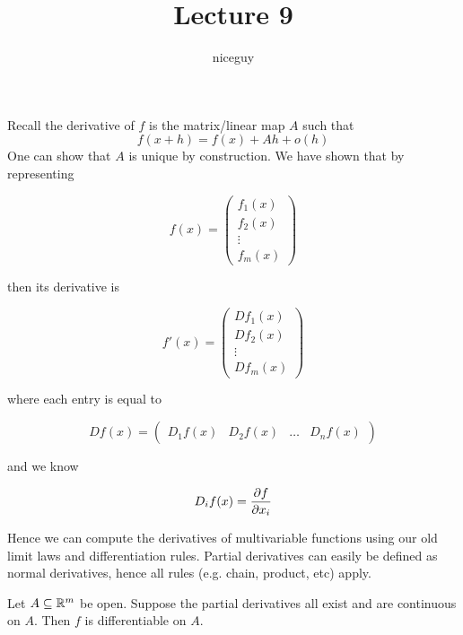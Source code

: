 \documentclass[12pt]{article}
\title{Lecture 9}
\author{niceguy}
\begin{document}
\maketitle

Recall the derivative of $f$ is the matrix/linear map $A$ such that
$$f(x+h) = f(x) + Ah + o(h)$$
One can show that $A$ is unique by construction. We have shown that by representing

$$f(x) = \begin{pmatrix} f_1(x) \\ f_2(x) \\ \vdots \\ f_m(x) \end{pmatrix}$$

then its derivative is

$$f'(x) = \begin{pmatrix} Df_1(x) \\ Df_2(x) \\ \vdots \\ Df_m(x) \end{pmatrix}$$

where each entry is equal to

$$Df(x) = \begin{pmatrix} D_1f(x) & D_2f(x) & \dots & D_nf(x) \end{pmatrix}$$

and we know

$$D_if(x) = \frac{\partial f}{\partial x_i}$$

Hence we can compute the derivatives of multivariable functions using our old limit laws and differentiation rules. Partial derivatives can easily be defined as normal derivatives, hence all rules (e.g. chain, product, etc) apply.

\begin{thm}
    Let $A\subseteq\mathbb{R}^m$ be open. Suppose the partial derivatives all exist and are continuous on $A$. Then $f$ is differentiable on $A$.
\end{thm}
\end{document}
